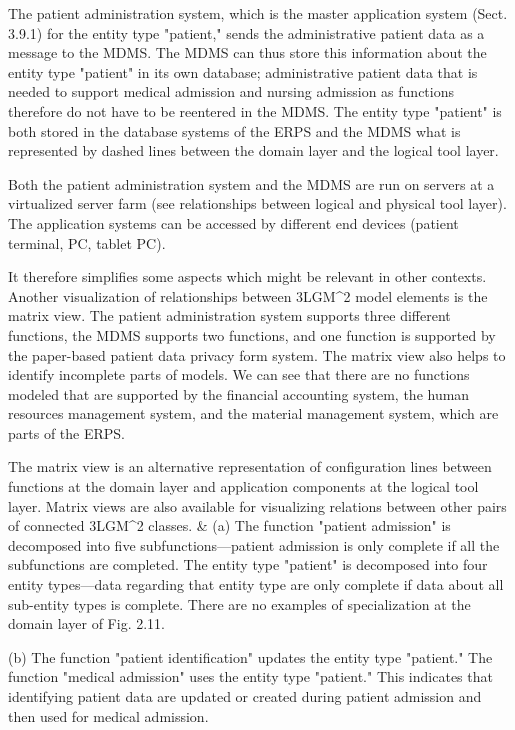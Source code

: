 The patient administration system, which is the master application system (Sect. 3.9.1) for the entity type "patient," sends the administrative patient data as a message to the MDMS.
The MDMS can thus store this information about the entity type "patient" in its own database; administrative patient data that is needed to support medical admission and nursing admission as functions therefore do not have to be reentered in the MDMS.
The entity type "patient" is both stored in the database systems of the ERPS and the MDMS what is represented by dashed lines between the domain layer and the logical tool layer.

Both the patient administration system and the MDMS are run on servers at a virtualized server farm (see relationships between logical and physical tool layer). The application systems can be accessed by different end devices (patient terminal, PC, tablet PC).

It therefore simplifies some aspects which might be relevant in other contexts.
Another visualization of relationships between 3LGM^2 model elements is the matrix view.
The patient administration system supports three different functions, the MDMS supports two functions, and one function is supported by the paper-based patient data privacy form system.
The matrix view also helps to identify incomplete parts of models.
We can see that there are no functions modeled that are supported by the financial accounting system, the human resources management system, and the material management system, which are parts of the ERPS.

The matrix view is an alternative representation of configuration lines between functions at the domain layer and application components at the logical tool layer. Matrix views are also available for visualizing relations between other pairs of connected 3LGM^2 classes. & (a) The function "patient admission" is decomposed into five subfunctions—patient admission is only complete if all the subfunctions are completed. The entity type "patient" is decomposed into four entity types—data regarding that entity type are only complete if data about all sub-entity types is complete. There are no examples of specialization at the domain layer of Fig. 2.11.

(b) The function "patient identification" updates the entity type "patient." The function "medical admission" uses the entity type "patient." This indicates that identifying patient data are updated or created during patient admission and then used for medical admission.
 
